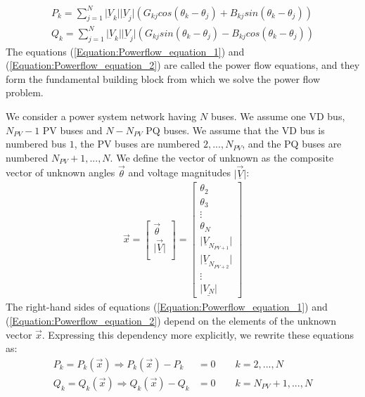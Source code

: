\begin{align}
	{P}_{k} = \sum_{j=1}^{N} \vert \underbar{V}_{k} \vert \vert \underbar{V}_{j} \vert \left ( G_{kj}cos(\theta_{k} - \theta_{j}) + B_{kj} sin(\theta_{k} - \theta_{j}) \right )  \label{Equation:Powerflow_equation_1} \\
	{Q}_{k} = \sum_{j=1}^{N} \vert \underbar{V}_{k} \vert \vert \underbar{V}_{j} \vert \left ( G_{kj}sin(\theta_{k} - \theta_{j}) - B_{kj} cos(\theta_{k} - \theta_{j}) \right ) \label{Equation:Powerflow_equation_2}
\end{align}
The equations (\ref{Equation:Powerflow_equation_1}) and (\ref{Equation:Powerflow_equation_2}) are called the power flow equations, and they form the fundamental building block from which we solve the power flow problem. 

We consider a power system network having $N$ buses. We assume one VD bus, $N_{PV}-1$ PV buses and $N-N_{PV}$ PQ buses. We assume that the VD bus is numbered bus $1$, the PV buses are numbered $2,...,N_{PV}$, and the PQ buses are numbered $N_{PV}+1,...,N$. We define the vector of unknown as the composite vector of unknown angles $\vec{\theta}$ and voltage magnitudes $\vert  \vec{\underline{V}} \vert$:
\begin{align}
\vec{x} = \left [ \begin{array}{c} \vec{\theta} \\ \vert  \vec{\underline{V}} \vert \\ \end{array} \right ]
			 = \left[ \begin{array}{c} \theta_{2} \\ \theta_{3} \\ \vdots \\ \theta_{N} \\ \vert \underline{ V}_{N_{PV+1}} \vert \\ \vert \underline{ V}_{N_{PV+2}} \vert \\ \vdots \\ \vert \underline{ V_{N} } \vert \end{array} \right]
 \label{Equation:Solution_vector}
\end{align}
The right-hand sides of equations (\ref{Equation:Powerflow_equation_1}) and (\ref{Equation:Powerflow_equation_2}) depend on the elements of the unknown vector $\vec{x}$. Expressing this dependency more explicitly, we rewrite these equations as:
\begin{align}
P_{k} = P_{k} (\vec{x}) \Rightarrow P_{k}(\vec{x}) - P_{k} &= 0 \quad \quad k = 2,...,N \\
Q_{k} = Q_{k} (\vec{x}) \Rightarrow Q_{k} (\vec{x}) - Q_{k} &= 0 \quad \quad k = N_{PV}+1,...,N 
\end{align}
